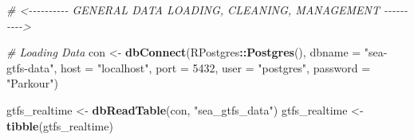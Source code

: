 \documentclass[
  12pt,
]{article}
\newenvironment{Shaded}{\begin{snugshade}}{\end{snugshade}}
\newcommand{\AttributeTok}[1]{\textcolor[rgb]{0.13,0.29,0.53}{#1}}
\newcommand{\CommentTok}[1]{\textcolor[rgb]{0.56,0.35,0.01}{\textit{#1}}}
\newcommand{\DecValTok}[1]{\textcolor[rgb]{0.00,0.00,0.81}{#1}}
\newcommand{\FunctionTok}[1]{\textcolor[rgb]{0.13,0.29,0.53}{\textbf{#1}}}
\newcommand{\NormalTok}[1]{#1}
\newcommand{\OtherTok}[1]{\textcolor[rgb]{0.56,0.35,0.01}{#1}}
\newcommand{\SpecialCharTok}[1]{\textcolor[rgb]{0.81,0.36,0.00}{\textbf{#1}}}
\newcommand{\StringTok}[1]{\textcolor[rgb]{0.31,0.60,0.02}{#1}}
\begin{document}
\begin{Shaded}
\begin{Highlighting}[]
\CommentTok{\# \textless{}{-}{-}{-}{-}{-}{-}{-}{-}{-}{-} GENERAL DATA LOADING, CLEANING, MANAGEMENT {-}{-}{-}{-}{-}{-}{-}{-}{-}{-}\textgreater{}}

\CommentTok{\# Loading Data}
\NormalTok{con }\OtherTok{\textless{}{-}} \FunctionTok{dbConnect}\NormalTok{(RPostgres}\SpecialCharTok{::}\FunctionTok{Postgres}\NormalTok{(),}
                 \AttributeTok{dbname =} \StringTok{"sea{-}gtfs{-}data"}\NormalTok{,}
                 \AttributeTok{host =} \StringTok{"localhost"}\NormalTok{,}
                 \AttributeTok{port =} \DecValTok{5432}\NormalTok{,}
                 \AttributeTok{user =} \StringTok{"postgres"}\NormalTok{,}
                 \AttributeTok{password =} \StringTok{"Parkour"}\NormalTok{)}

\NormalTok{gtfs\_realtime }\OtherTok{\textless{}{-}} \FunctionTok{dbReadTable}\NormalTok{(con, }\StringTok{"sea\_gtfs\_data"}\NormalTok{)}
\NormalTok{gtfs\_realtime }\OtherTok{\textless{}{-}} \FunctionTok{tibble}\NormalTok{(gtfs\_realtime)}
\end{Highlighting}
\end{Shaded}
\end{document}
